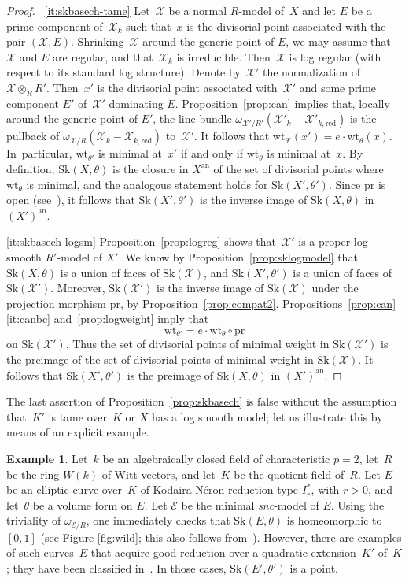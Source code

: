 \documentclass[11pt]{article}
\newcommand{\skpt}{\smallskip}
\theoremstyle{definition}
\newtheorem{example}[equation]{Example}
\numberwithin{equation}{subsection}
\newcommand{\cX}{\ensuremath{\mathscr{X}}}
\newcommand{\cE}{\ensuremath{\mathscr{E}}}
\newcommand{\snc}{\textit{snc}}
\newcommand{\an}{\mathrm{an}}
\newcommand{\pr}{\mathrm{pr}}
\newcommand{\red}{\mathrm{red}}
\newcommand{\Sk}{\mathrm{Sk}}
\newcommand{\wt}{\mathrm{wt}}
\let\form\theta
\begin{document}
\skpt
\begin{proof}
~\eqref{it:skbasech-tame} Let~$\cX$ be a normal $R$\nobreakdash-model of~$X$ and let $E$ be a prime component of~$\cX_k$ such that~$x$ is the divisorial point associated with the pair $(\cX,E)$. Shrinking~$\cX$ around the generic point of $E$, we may assume that~$\cX$ and $E$ are regular, and that~$\cX_k$ is irreducible. Then~$\cX$ is log regular (with respect to its standard log structure).
Denote by~$\cX'$ the normalization of $\cX\otimes_R R'$. Then~$x'$ is the divisorial point associated with~$\cX'$ and some prime component $E'$ of~$\cX'$ dominating $E$.
Proposition~\ref{prop:can} implies that, locally around the generic point of $E'$, the line bundle $\omega_{\cX'/R'}(\cX'_k-\cX'_{k,\red})$ is the pullback of $\omega_{\cX/R}(\cX_k-\cX_{k,\red})$ to~$\cX'$. It follows that $\wt_{\form'}(x')=e\cdot \wt_{\form}(x)$. In~particular, $\wt_{\form'}$ is minimal at~$x'$ if and only if
$\wt_{\form}$ is minimal at~$x$.
By definition, $\Sk(X,\form)$ is the closure in $X^{\an}$ of the set of divisorial points where $\wt_{\form}$ is minimal, and the analogous statement holds for
$\Sk(X',\form')$. Since $\pr$ is open (see~\cite[3.2.7]{BerkIHES}),
it follows that $\Sk(X',\form')$ is the inverse image of $\Sk(X,\form)$ in $(X')^{\an}$.

\eqref{it:skbasech-logsm}
Proposition~\ref{prop:logreg} shows that~$\cX'$ is a proper log smooth $R'$-model of $X'$. We know by Proposition~\ref{prop:sklogmodel} that $\Sk(X,\form)$ is a union of faces of $\Sk(\cX)$, and
$\Sk(X',\form')$ is a union of faces of $\Sk(\cX')$.
Moreover, $\Sk(\cX')$ is the inverse image of $\Sk(\cX)$ under the projection morphism $\pr$, by Proposition~\ref{prop:compat2}.
Propositions~\ref{prop:can}\eqref{it:canbc} and~\ref{prop:logweight} imply that
\[
\wt_{\form'}=e\cdot \wt_{\form}\circ \pr
\]
on $\Sk(\cX')$.
Thus the set of divisorial points of minimal weight in $\Sk(\cX')$ is the preimage of the set of divisorial points of minimal weight in $\Sk(\cX)$.
It follows that $\Sk(X',\form')$ is the preimage of $\Sk(X,\form)$ in $(X')^{\an}$.
\end{proof}

The last assertion of Proposition~\ref{prop:skbasech} is false without the assumption that~$K'$ is tame over~$K$ or $X$ has a log smooth model; let us illustrate this by means of an explicit example.

\begin{example}\label{exam:wild}
Let~$k$ be an algebraically closed field of characteristic $p=2$, let~$R$ be the ring $W(k)$ of Witt vectors, and let~$K$ be the quotient field of~$R$.
Let $E$ be an elliptic curve over~$K$ of Kodaira-Néron reduction type $I_{r}^{\ast}$, with $r>0$, and let~$\form$ be a volume form on $E$.
Let $\cE$ be the minimal \snc-model of $E$. Using the triviality of $\omega_{\cE/R}$, one immediately checks that $\Sk(E,\form)$ is homeomorphic to $[0,1]$ (see Figure \ref{fig:wild}; this also follows from~\cite[3.3.13]{BaNi}).
However, there are examples of such curves~$E$ that acquire good reduction over a quadratic extension~$K'$ of~$K$; they have been classified in~\cite[2.8]{lor}. In those cases, $\Sk(E',\form')$ is a point.
\end{example}
\end{document}
